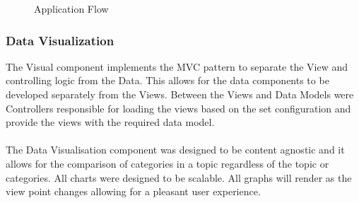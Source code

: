 \documentclass[12pt]{article} %
\begin{document}
		\begin{figure}[H] %
			\caption{Application Flow}
			\label{fig:speciation}
		\end{figure}
	
	\subsubsection{Data Visualization}
	
	The Visual component implements the MVC pattern to separate the View and controlling logic from the Data. This allows for the data components to be developed separately from the Views. Between the Views and Data Models were Controllers responsible for  loading the views based on the set configuration and provide the views with the required data model.\\
	\\
	The Data Visualisation component was designed to be content agnostic and it allows for the comparison of categories in a topic regardless of the topic or categories.
	All charts were designed to be scalable. All graphs will render as the view point changes allowing for a pleasant user experience.
	
\end{document}
